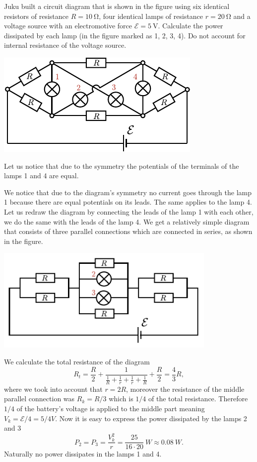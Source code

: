 Juku built a circuit diagram that is shown in the figure using six identical resistors of resistance $R=\SI{10}{\ohm}$, four identical lamps of resistance $r=\SI{20}{\ohm}$ and a voltage source with an electromotive force $\mathcal{E}=\SI{5}{\volt}$. Calculate the power dissipated by each lamp (in the figure marked as 1, 2, 3, 4). Do not account for internal resistance of the voltage source.
\begin{center}
\includegraphics[width=0.6\linewidth]{2013-lahg-09-lambidJoonis-crop}
\end{center}

\hinteng
Let us notice that due to the symmetry the potentials of the terminals of the lamps 1 and 4 are equal.

\solueng
We notice that due to the diagram’s symmetry no current goes through the lamp 1 because there are equal potentials on its leads. The same applies to the lamp 4. Let us redraw the diagram by connecting the leads of the lamp 1 with each other, we do the same with the leads of the lamp 4. We get a relatively simple diagram that consists of three parallel connections which are connected in series, as shown in the figure.
\begin{center}
\includegraphics[width=0.8\textwidth]{2013-lahg-09-ahelLah}
\end{center}
We calculate the total resistance of the diagram
\[R_t = \frac{R}{2} + \frac{1}{\frac{1}{R}+\frac{1}{r}+\frac{1}{r}+\frac{1}{R}}+\frac{R}{2} =\frac{4}{3}R,\] 
where we took into account that $r=2R$, moreover the resistance of the middle parallel connection was $R_k=R/3$ which is $1/4$ of the total resistance. Therefore $1/4$ of the battery’s voltage is applied to the middle part meaning $V_k = \mathcal{E}/4 = 5/4\si{V}$. Now it is easy to express the power dissipated by the lamps 2 and 3
\[P_2=P_3=\frac{V_k^2}{r}=\frac{25}{16\cdot 20}\SI{}{W}\approx\SI{0,08}{W}.\] 
Naturally no power dissipates in the lamps 1 and 4.
\probend